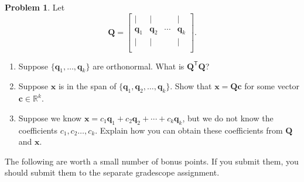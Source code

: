 \documentclass[12pt]{article}
\theoremstyle{definition}
\newtheorem{problem}{Problem}
\renewcommand{\vec}{\mathbf}
\newcommand{\T}{\mathsf{T}}
\begin{document}
\begin{problem}
Let 
\[
\vec{Q} = \begin{bmatrix}
|&|&&| \\
\vec{q}_1 & \vec{q}_2 & \cdots & \vec{q}_k \\
|&|&&| \\
\end{bmatrix}.
\]

\begin{enumerate}
    \item Suppose $\{\vec{q}_1, \ldots, \vec{q}_k\}$ are orthonormal. What is $\vec{Q}^\T \vec{Q}$?
    \item Suppose $\vec{x}$ is in the span of $\{\vec{q}_1, \vec{q}_2, \ldots, \vec{q}_k\}$. Show that $\vec{x} = \vec{Q}\vec{c}$ for some vector $\vec{c}\in\mathbb{R}^k$.
    \item Suppose we know $\vec{x} = c_1 \vec{q}_1 + c_2 \vec{q}_2 + \cdots + c_k \vec{q}_k$, but we do not know the coefficients $c_1, c_2 \ldots, c_k$. 
       Explain how you can obtain these coefficients from $\vec{Q}$ and $\vec{x}$.
\end{enumerate}

\end{problem}



\clearpage

The following are worth a small number of bonus points. If you submit them, you should submit them to the separate gradescope assignment.
\end{document}
